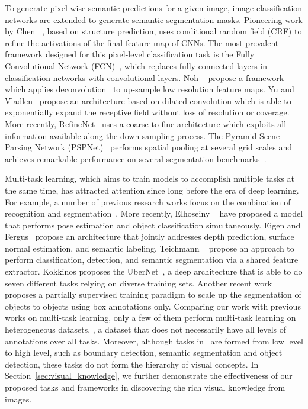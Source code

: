 \documentclass[runningheads]{llncs}
\begin{document}
 To generate pixel-wise semantic predictions for a given image, image classification networks \cite{krizhevsky2012imagenet,simonyan2014very,szegedy2015going,he2016deep} are extended to generate semantic segmentation masks. Pioneering work by Chen \etal~\cite{chen2014semantic}, based on structure prediction, uses conditional random field (CRF) to refine the activations of the final feature map of CNNs. The most prevalent framework designed for this pixel-level classification task is the Fully Convolutional Network (FCN)~\cite{long2015fully}, which replaces fully-connected layers in classification networks with convolutional layers. Noh \etal~\cite{noh2015learning} propose a framework which applies deconvolution~\cite{zeiler2011adaptive} to up-sample low resolution feature maps. Yu and Vladlen~\cite{yu2015multi} propose an architecture based on dilated convolution which is able to exponentially expand the receptive field without loss of resolution or coverage. More recently, RefineNet~\cite{lin2017refinenet} uses a coarse-to-fine architecture which exploits all information available along the down-sampling process. The Pyramid Scene Parsing Network (PSPNet)~\cite{zhao2017pyramid} performs spatial pooling at several grid scales and achieves remarkable performance on several segmentation benchmarks~\cite{everingham2010pascal,cordts2016cityscapes,zhou2017scene}. 

 Multi-task learning, which aims to train models to accomplish multiple tasks at the same time, has attracted attention since long before the era of deep learning. For example, a number of previous research works focus on the combination of recognition and segmentation~\cite{keeler1991integrated,kokkinos2005expectation,maire2011object}. More recently, Elhoseiny \etal~\cite{elhoseiny2015convolutional} have proposed a model that performs pose estimation and object classification simultaneously. Eigen and Fergus~\cite{eigen2015predicting} propose an architecture that jointly addresses depth prediction, surface normal estimation, and semantic labeling. Teichmann \etal~\cite{teichmann2016multinet} propose an approach to perform classification, detection, and semantic segmentation via a shared feature extractor. Kokkinos proposes the UberNet~\cite{kokkinos2016ubernet}, a deep architecture that is able to do seven different tasks relying on diverse training sets. Another recent work \cite{hu2017learning} proposes a partially supervised training paradigm to scale up the segmentation of objects to  objects using box annotations only. Comparing our work with previous works on multi-task learning, only a few of them perform multi-task learning on heterogeneous datasets, \ie, a dataset that does not necessarily have all levels of annotations over all tasks. Moreover, although tasks in~\cite{kokkinos2016ubernet} are formed from low level to high level, such as boundary detection, semantic segmentation and object detection, these tasks do not form the hierarchy of visual concepts. In Section~\ref{sec:visual_knowledge}, we further demonstrate the effectiveness of our proposed tasks and frameworks in discovering the rich visual knowledge from images.
\end{document}
